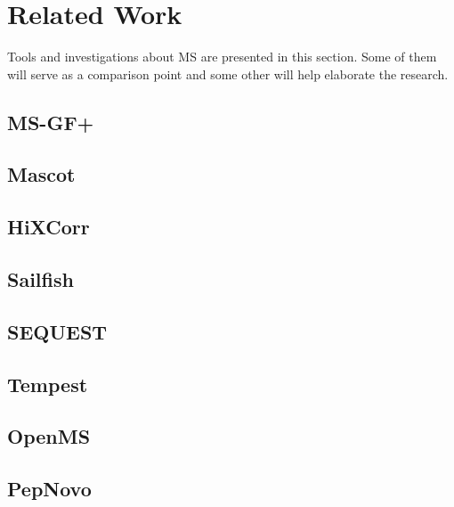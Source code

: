 \newpage
\section{Related Work}
\label{section:related-work}
Tools and investigations about \ac{MS} are presented in this section. Some of them will serve as a comparison point and some other will help elaborate the research.

\subsection{MS-GF+}


\subsection{Mascot}


\subsection{HiXCorr}


\subsection{Sailfish}
 
 
 \subsection{SEQUEST}
 

 \subsection{Tempest}
  

 \subsection{OpenMS}
 
 
 \subsection{PepNovo}
 
 
